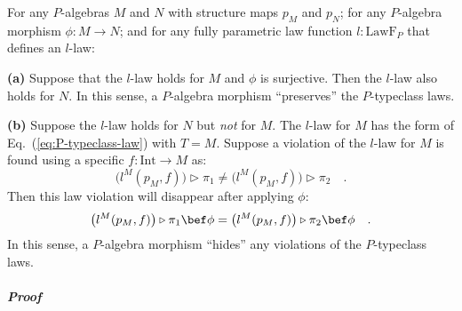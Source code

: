 For any $P$-algebras $M$ and $N$ with structure maps $p_{M}$ and
$p_{N}$; for any $P$-algebra morphism $\phi:M\rightarrow N$; and
for any fully parametric law function $l:\text{LawF}_{P}$ that defines
an $l$-law:

\textbf{(a)} Suppose that the $l$-law holds for $M$ and $\phi$
is surjective. Then the $l$-law also holds for $N$. In this sense,
a $P$-algebra morphism \textsf{``}preserves\textsf{''} the $P$-typeclass laws.

\textbf{(b)} Suppose the $l$-law holds for $N$ but \emph{not} for
$M$. The $l$-law for $M$ has the form of Eq.~(\ref{eq:P-typeclass-law})
with $T=M$. Suppose a violation of the $l$-law for $M$ is found
using a specific $f:\text{Int}\rightarrow M$ as:
\begin{equation}
\big(l^{M}(p_{M},f)\big)\triangleright\pi_{1}\neq\big(l^{M}(p_{M},f)\big)\triangleright\pi_{2}\quad.\label{eq:p-typeclass-law-violation}
\end{equation}
Then this law violation will disappear after applying $\phi$:
\begin{equation}
\big(l^{M}(p_{M},f)\big)\triangleright\pi_{1}\bef\phi=\big(l^{M}(p_{M},f)\big)\triangleright\pi_{2}\bef\phi\quad.\label{eq:p-typeclass-law-violation-hidden}
\end{equation}
In this sense, a $P$-algebra morphism \textsf{``}hides\textsf{''} any violations
of the $P$-typeclass laws.

\subparagraph{Proof}

